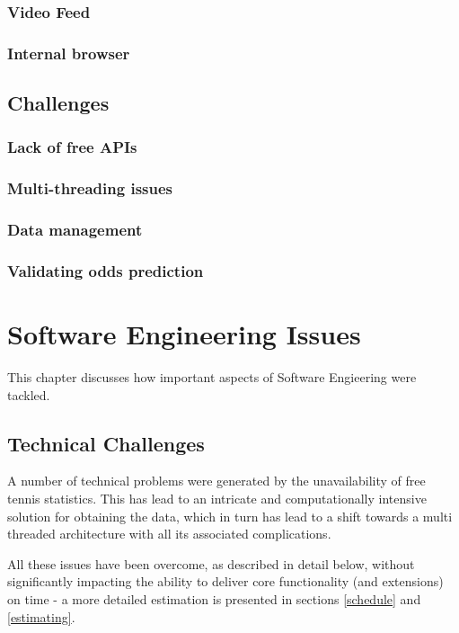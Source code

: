 \documentclass[10pt]{report}
\begin{document}
\subsection {Video Feed}

\subsection {Internal browser}


\section{Challenges}
\subsection {Lack of free APIs}
\subsection {Multi-threading issues}
\subsection {Data management}
\subsection {Validating odds prediction}


\chapter{Software Engineering Issues}

This chapter discusses how important aspects of Software Engieering were tackled.

\section{Technical Challenges}

A number of technical problems were generated by the unavailability of free tennis statistics. This has lead to an intricate and computationally intensive solution for obtaining the data, which in turn has lead to a shift towards a multi threaded architecture with all its associated complications.

All these issues have been overcome, as described in detail below, without significantly impacting the ability to deliver core functionality (and extensions) on time - a more detailed estimation is presented in sections \ref{schedule} and  \ref{estimating}.
\end{document}
